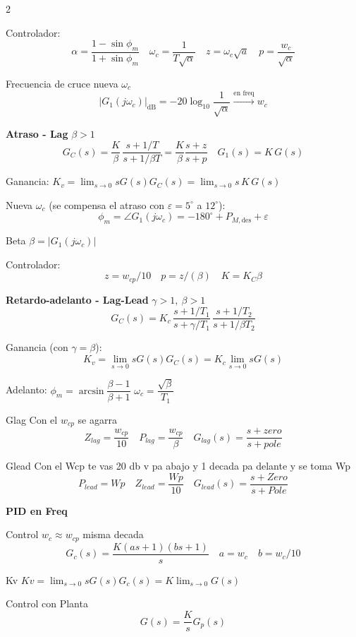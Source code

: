 \documentclass{article}
\begin{document}
\begin{multicols}{2}
\begin{itemform}
  \item Controlador:
  $$
  \alpha = \dfrac{1-\sin\phi_m}{1+\sin\phi_m} \quad \omega_c = \dfrac{1}{T\sqrt{\alpha}} \quad z = \omega_c \sqrt{a} \quad p = \dfrac{w_c}{\sqrt{\alpha} } 
  $$
  \item Frecuencia de cruce nueva $\omega_c$ 
  $$
  |G_1(j\omega_c)|_{\text{dB}} = \boxed{ -20\log_{10}\dfrac{1}{\sqrt{\alpha}}} \xrightarrow{\text{en freq}} w_c 
  $$
  \end{itemform}
  \textbf{Atraso - Lag} \quad $\beta>1$
  $$
  G_C(s) = \dfrac{K}{\beta}\,\dfrac{s+{1}/{T}}{s+{1}/{\beta T}}= \dfrac{K}{\beta} \dfrac{s+z}{s+p} \quad G_1(s)=K\,G(s)
  $$
  \begin{itemform}
  \item Ganancia: $K_v = \lim_{s\to 0} sG(s)G_C(s) = \lim_{s\to 0} s\,K\,G(s)$
  \item Nueva $\omega_c$ (se compensa el atraso con $\varepsilon=5^\circ$ a $12^\circ$):
  $$
 \phi_m = \angle G_1(j\omega_c) = -180^\circ + P_{M,\text{des}} + \varepsilon
  $$
  \item Beta
  $
  \beta = |G_1(j\omega_c)| 
  $
  \item Controlador:
  $$
  z = w_{cp}/10 \quad p = z/(\beta) \quad K=K_C \beta
  $$
  \end{itemform}
  \textbf{Retardo-adelanto - Lag-Lead} \quad $\gamma>1,\ \beta>1$
  $$
  G_C(s)  = K_c\,\dfrac{s+{1}/{T_1}}{s+{\gamma}/{T_1}}\,\dfrac{s+{1}/{T_2}}{s+{1}/{\beta T_2}}
  $$
  \begin{itemform}
  \item Ganancia (con $\gamma=\beta$): 
  $$K_v = \lim_{s\to 0} sG(s)G_C(s) = K_c \lim_{s\to 0} sG(s)$$
  \item Adelanto: $\phi_m = \arcsin\dfrac{\beta-1}{\beta+1}$ \quad $\omega_c=\dfrac{\sqrt{\beta}}{T_1}$ %
  \item Glag
  Con el $w_{cp}$ se agarra 
  $$
  Z_{lag} = \dfrac{w_{cp}}{10} \quad P_{lag} = \dfrac{w_{cp}}{\beta } \quad G_{lag}(s) = \dfrac{s+zero}{s+pole}
  $$
  \item Glead
  Con el Wcp te vas 20 db  v pa abajo y 1 decada pa delante y se toma Wp
  $$
  P_{lead} = Wp \quad Z_{lead} = \dfrac{Wp}{10} \quad G_{lead}(s) = \dfrac{s+Zero}{s+Pole}
  $$
\end{itemform}
  \textbf{PID en Freq}
  \begin{itemform}
    \item Control $w_c \approx w_{cp}$ misma decada
    $$
    G_c(s) = \dfrac{K (as+1)(bs+1)}{s} \quad a = w_{c} \quad b = w_{c}/10 
    $$
    \item Kv
    $
    Kv = \lim_{s\to 0} sG(s)G_c(s) = K \lim_{s\to 0} G(s)
    $
    \item Control con Planta
    $$
    G(s)=\dfrac{K}{s} G_p(s)
    $$
  \end{itemform}
  


\end{multicols}
\end{document}
